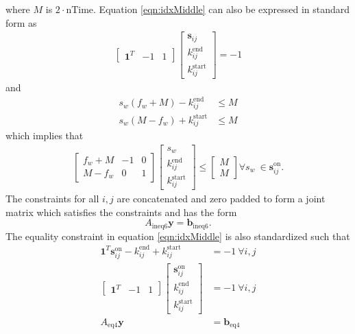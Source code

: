 where $M$ is $2\cdot\text{nTime}$.
Equation \ref{eqn:idxMiddle} can also be expressed in standard form as
\begin{equation} \begin{aligned}
	\begin{bmatrix}\mathbf{1}^T & - 1 & 1 \end{bmatrix} \begin{bmatrix}\mathbf{s}_{ij} \\ k_{ij}^{\text{end}} \\ k_{ij}^{\text{start}} \end{bmatrix} = -1
\end{aligned} \end{equation}
and
\begin{equation}\begin{aligned}
	s_w\left (f_w + M \right) - k_{ij}^{\text{end}} &\le M \\
	s_w\left (M - f_w\right) + k_{ij}^{\text{start}} &\le M 
\end{aligned}\end{equation}
which implies that
\begin{equation} \begin{aligned}
	\begin{bmatrix}f_w + M & -1 & 0\\
		       M - f_w & 0 & 1 
	\end{bmatrix} 
	\begin{bmatrix}s_w                 \\
		       k_{ij}^{\text{end}} \\ 
		       k_{ij}^{\text{start}}
	\end{bmatrix} \le
	\begin{bmatrix} M \\
	                M 
	\end{bmatrix} \forall s_w \ \in \mathbf{s}_{ij}^{\text{on}}.
\end{aligned}\end{equation}
The constraints for all $i,j$ are concatenated and zero padded to form a joint matrix which satisfies the constraints and has the form 
\begin{equation}
	A_{\text{ineq6}}\mathbf{y} = \mathbf{b}_{\text{ineq6}}.
\end{equation}
The equality constraint in equation \ref{eqn:idxMiddle} is also standardized such that
\begin{equation} \begin{aligned}
	\mathbf{1}^T\mathbf{s}_{ij}^{\text{on}} - k_{ij}^{\text{end}} + k_{ij}^{\text{start}} &= -1 \ \forall i,j\\
	\begin{bmatrix}\mathbf{1}^T & -1 & 1\end{bmatrix} \begin{bmatrix}\mathbf{s}_{ij}^{\text{on}} \\ k_{ij}^{\text{end}} \\ k_{ij}^{\text{start}} \end{bmatrix} &= -1 \ \forall i,j \\
		A_{\text{eq4}}\mathbf{y} &= \mathbf{b}_{\text{eq4}}
\end{aligned} \end{equation}

